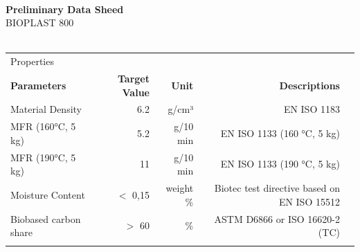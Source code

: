 \documentclass{article}
\begin{document}
\begin{flushleft}
\hspace{1cm}\\
\textbf{Preliminary Data Sheed}\\
BIOPLAST 800\\
\hspace{1cm}\\
\end{flushleft}
\begin{center}
\begin{tabularx}
{\textwidth}{X r  r  r  r }\rowcolor{color_title}Properties &  &  &  &  \\
\textbf{Parameters} & \textbf{Target Value} & \textbf{Unit} & \textbf{Descriptions} &  \\
Material Density  & 6.2 & g/cm³ & EN ISO 1183 &  \\
\arrayrulecolor{line_color}\hline
MFR (160°C, 5 kg) & 5.2 & g/10 min & EN ISO 1133 (160 °C, 5 kg) &  \\
\arrayrulecolor{line_color}\hline
MFR (190°C, 5 kg) & 11 & g/10 min & EN ISO 1133 (190 °C, 5 kg) &  \\
\arrayrulecolor{line_color}\hline
Moisture Content & \(<\) 0,15 & weight \% & Biotec test directive based on EN ISO 15512 &  \\
\arrayrulecolor{line_color}\hline
Biobased carbon share & \(>\) 60 & \% & ASTM D6866 or ISO 16620-2 (TC) &  \\
\arrayrulecolor{line_color}\hline

\end{tabularx}
\end{center}
\end{document}
